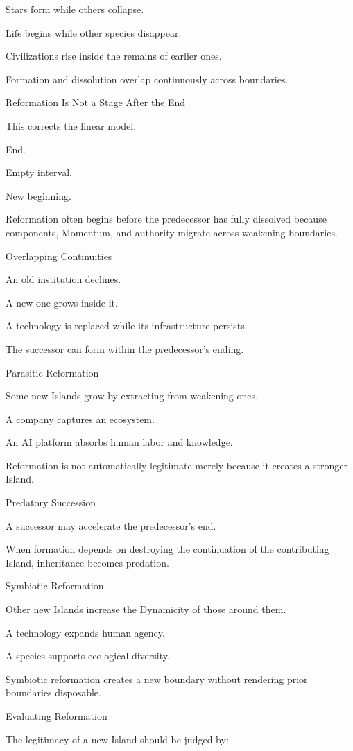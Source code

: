 Stars form while others collapse.

Life begins while other species disappear.

Civilizations rise inside the remains of earlier ones.

Formation and dissolution overlap continuously across boundaries.

Reformation Is Not a Stage After the End

This corrects the linear model.

End.

Empty interval.

New beginning.

Reformation often begins before the predecessor has fully dissolved because components, Momentum, and authority migrate across weakening boundaries.

Overlapping Continuities

An old institution declines.

A new one grows inside it.

A technology is replaced while its infrastructure persists.

The successor can form within the predecessor’s ending.

Parasitic Reformation

Some new Islands grow by extracting from weakening ones.

A company captures an ecosystem.

An AI platform absorbs human labor and knowledge.

Reformation is not automatically legitimate merely because it creates a stronger Island.

Predatory Succession

A successor may accelerate the predecessor’s end.

When formation depends on destroying the continuation of the contributing Island, inheritance becomes predation.

Symbiotic Reformation

Other new Islands increase the Dynamicity of those around them.

A technology expands human agency.

A species supports ecological diversity.

Symbiotic reformation creates a new boundary without rendering prior boundaries disposable.

Evaluating Reformation

The legitimacy of a new Island should be judged by:


